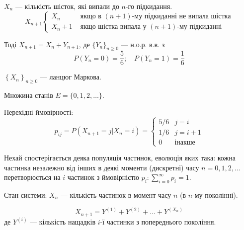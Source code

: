 \begin{example}
  $X_n$ --- кількість шісток, які випали до  $n$-го підкидання. 
\[ X_{n+1}  \begin{cases}
  X_n & \text{ якщо в $\left( n+1 \right)$-му підкиданні не випала шістка} \\ 
  X_n + 1 & \text{ якщо шістка випала у $(n+1)$-му підкиданні }
\end{cases} \] 

Тоді $X_{n+1} = X_n + Y_{n+1}$, де $\{Y_n\}_{n \geq 0}$ --- н.о.р. в.в. з 
\[ P\left( Y_n = 0 \right) =\frac{5}{6} ; \quad P\left( Y_n = 1 \right) = \frac{1}{6} \] 

$\left\{ X_n \right\}_{n \geq 0} $ --- ланцюг Маркова.

Множина станів $E = \{0,1,2,\ldots\} $.

Перехідні ймовірності:
\[ p_{ij}=P\left( X_{n+1} = j | X_n = i \right) = \begin{cases}
  5/6 & j = i \\
  1/6 & j = i+1 \\
  0 & \text{інакше}
\end{cases} \] 
\end{example}

\begin{example}
  Нехай спостерігається деяка популяція частинок, еволюція яких така: кожна
  частинка незалежно від інших в деякі моменти (дискретні) часу $n = 0, 1, 2, \ldots$
  перетворюється на $i$ частинок з ймовірністю $p_i: \sum_{i=0}^{\infty} p_i = 1$.
  
  Стан системи: $X_n$ --- кількість частинок в момент часу $n$ (в  $n$-му поколінні).

   \[ X_{n+1} = Y^{(1)} + Y^{(2)} + \ldots + Y^{(X_n)} \]
   де $Y^{(i)}$ --- кількість нащадків $i$-ї частинки з попереднього покоління.
\end{example}

